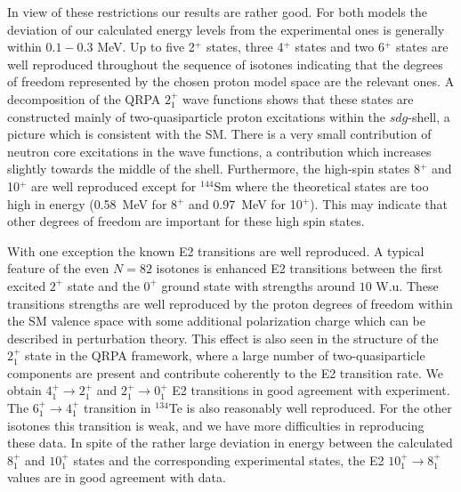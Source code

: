 In view of these restrictions our results are rather good.
For both models the deviation of our calculated 
energy levels from the experimental ones is generally within $0.1 - 0.3$ 
MeV. Up to five 2$^+$ states, three 4$^+$ states and two 6$^+$ states
are well reproduced throughout the sequence of isotones
indicating that the degrees of freedom represented by the chosen proton 
model space are the relevant ones.   
A decomposition of the QRPA $2^{+}_{1}$ wave functions shows
that these states are constructed mainly of two-quasiparticle proton
excitations within the $sdg$-shell, a picture which is consistent with the SM. 
There is a very  small contribution of neutron core excitations in the 
wave functions, a contribution 
which increases slightly towards the middle of the shell.
Furthermore,  
the high-spin states 8$^+$ and 10$^+$ are well reproduced
except for  $^{144}$Sm where the theoretical states 
are too high in energy (0.58~MeV for 8$^{+}$ and 0.97~MeV for 10$^{+}$).
This may indicate that other degrees of freedom are important for these 
high spin states. 

With one exception the known E2 transitions are well reproduced.
A  typical feature of the even $N=82$ isotones is enhanced E2 
transitions between the first excited $2^{+}$ state and the $0^{+}$ 
ground state with strengths around $10$ W.u. 
These transitions strengths are well reproduced  by the proton degrees of freedom 
within the SM valence space with some additional polarization charge which can be described 
in perturbation theory.  
This effect is  also seen in the structure of the $2^{+}_{1}$ state in the QRPA framework, 
where a large number of 
two-quasiparticle components are present and contribute coherently
to the E2 transition rate.
We obtain $4^{+}_{1} \rightarrow 2^{+}_{1}$ and 
$2^{+}_{1} \rightarrow 0^{+}_{1}$ E2 transitions in good agreement with 
experiment. The $6^{+}_{1} \rightarrow 4^{+}_{1}$ transition in $^{134}$Te is 
also reasonably well reproduced. For the other isotones this transition is 
weak, and we have more difficulties in reproducing these data.
In spite of the rather large deviation in energy between the calculated 
$8^{+}_{1}$ and $10^{+}_{1}$ states and the corresponding experimental states, 
the E2 $10^{+}_{1} \rightarrow 8^{+}_{1}$ values are in good agreement with 
data.

